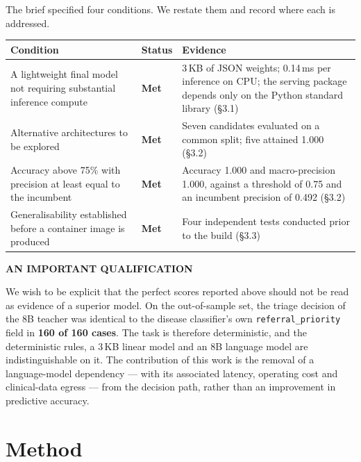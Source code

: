 \documentclass[11pt,a4paper]{article}
\newcommand{\code}[1]{\texttt{\small #1}}
\newcommand{\verd}[2]{\textbf{\textcolor{#1}{#2}}}
\newcommand{\eyebrow}[1]{%
  {\footnotesize\sffamily\bfseries\textcolor{accent}{\MakeUppercase{#1}}}}
\begin{document}
The brief specified four conditions. We restate them and record where each is
addressed.

\begin{table}[H]
\begin{tabularx}{\textwidth}{@{}L{52mm}L{18mm}Y@{}}
\toprule
\textbf{Condition} & \textbf{Status} & \textbf{Evidence} \\
\midrule
A lightweight final model not requiring substantial inference compute &
\verd{goGreen}{Met} &
3\,KB of JSON weights; 0.14\,ms per inference on CPU; the serving package
depends only on the Python standard library (\S3.1) \\
\addlinespace[3pt]
Alternative architectures to be explored &
\verd{goGreen}{Met} &
Seven candidates evaluated on a common split; five attained 1.000 (\S3.2) \\
\addlinespace[3pt]
Accuracy above 75\% with precision at least equal to the incumbent &
\verd{goGreen}{Met} &
Accuracy 1.000 and macro-precision 1.000, against a threshold of 0.75 and an
incumbent precision of 0.492 (\S3.2) \\
\addlinespace[3pt]
Generalisability established before a container image is produced &
\verd{goGreen}{Met} &
Four independent tests conducted prior to the build (\S3.3) \\
\bottomrule
\end{tabularx}
\end{table}

\begin{callout}[stopRed]
\eyebrow{An important qualification}

\vspace{3pt}
We wish to be explicit that the perfect scores reported above should not be
read as evidence of a superior model. On the out-of-sample set, the triage
decision of the 8B teacher was identical to the disease classifier's own
\code{referral\_priority} field in \textbf{160 of 160 cases}. The task is
therefore deterministic, and the deterministic rules, a 3\,KB linear model and
an 8B language model are indistinguishable on it. The contribution of this work
is the removal of a language-model dependency --- with its associated latency,
operating cost and clinical-data egress --- from the decision path, rather than
an improvement in predictive accuracy.
\end{callout}

\section{Method}
\end{document}

